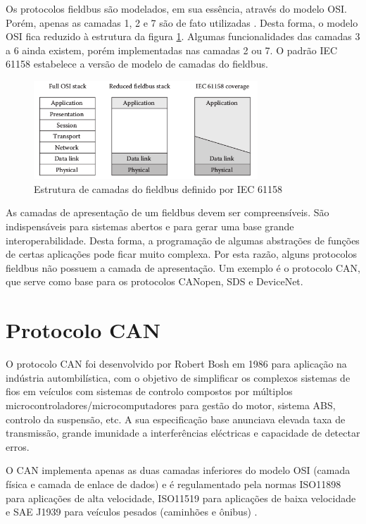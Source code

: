 Os protocolos fieldbus são modelados, em sua essência, através do modelo OSI. Porém, apenas as camadas 1, 2 e 7 são de fato utilizadas \cite{Pleinevaux-1988}. Desta forma, o modelo OSI fica reduzido à estrutura da figura \ref{im::osireduz}. Algumas funcionalidades das camadas 3 a 6 ainda existem, porém implementadas nas camadas 2 ou 7. O padrão IEC 61158 estabelece a versão de modelo de camadas do fieldbus.

\begin{figure}[H]
\centering
\includegraphics[width=0.75\textwidth]{imagens/osireduz}
\caption{Estrutura de camadas do fieldbus definido por IEC 61158 \cite{book:zur}}
\label{im::osireduz}
\end{figure}  

As camadas de apresentação de um fieldbus devem ser compreensíveis. São indispensáveis para sistemas abertos e para gerar uma base grande interoperabilidade. Desta forma, a programação de algumas abstrações de funções de certas aplicações pode ficar muito complexa. Por esta razão, alguns  protocolos fieldbus não possuem a camada de apresentação. Um exemplo é o protocolo CAN, que serve como base para os protocolos CANopen, SDS e DeviceNet.

\section{Protocolo CAN}

O protocolo CAN foi desenvolvido por Robert Bosh em 1986 para aplicação na indústria autombilística, com o objetivo de simplificar os complexos sistemas de fios em veículos com sistemas de controlo compostos por múltiplos microcontroladores/microcomputadores para gestão do motor, sistema ABS, controlo da suspensão, etc. A sua especificação base anunciava elevada taxa de transmissão, grande imunidade a interferências eléctricas e capacidade de detectar erros.

O CAN implementa apenas as duas camadas inferiores do modelo OSI (camada física e camada de enlace de dados) e é regulamentado pela normas ISO11898 para aplicações de alta velocidade, ISO11519 para aplicações de baixa velocidade e SAE J1939 para veículos pesados (caminhões e ônibus) \cite{canmicro}.

